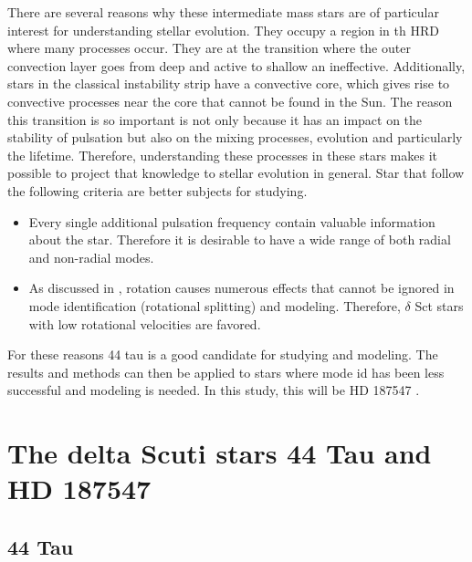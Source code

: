 There are several reasons why these intermediate mass stars are of particular interest for understanding stellar evolution. They occupy a region in th HRD where many processes occur. They are at the transition where the outer convection layer goes from deep and active to shallow an ineffective. Additionally, stars in the classical instability strip have a convective core, which gives rise to convective processes near the core that cannot be found in the Sun. The reason this transition is so important is not only because it has an impact on the stability of pulsation but also on the mixing processes, evolution and particularly the lifetime. Therefore, understanding these processes in these stars makes it possible to project that knowledge to stellar evolution in general. Star that follow the following criteria are better subjects for studying. 

\begin{itemize}
    \item Every single additional pulsation frequency contain valuable information about the star. Therefore it is desirable to have a wide range of both radial and non-radial modes. 
    \item As discussed in , rotation causes numerous effects that cannot be ignored in mode identification (rotational splitting) and modeling. Therefore,  $\delta$ Sct stars with low rotational velocities are favored. 
\end{itemize}

For these reasons 44 tau is a good candidate for studying and modeling. The results and methods can then be applied to stars where mode id has been less successful and modeling is needed. In this study, this will be HD 187547 \citep{antoci2014role}. 

\section{The delta Scuti stars 44 Tau and HD 187547}

\subsection{44 Tau}

